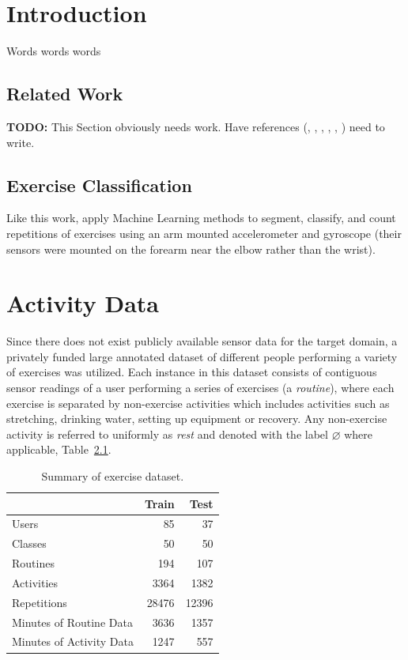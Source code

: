 \documentclass[12pt]{report}
\newcommand{\1}[0]{\mathbbm{1}}
\begin{document}
\chapter{Introduction}
Words words words

\section{Related Work}
\textbf{TODO:} This Section obviously needs work. Have references
(\cite{ms-overview},
\cite{arm-worn-muehlbauer},
\cite{phone-kwapisz},
\cite{weka-aaai-ravi},
\cite{multiple-sensor-bao},
\cite{taylor-crbm-2006}) need to write.

\section{Exercise Classification}
Like this work, \cite{ms-activity} apply Machine Learning methods to segment, classify, and count repetitions
of exercises using an arm mounted accelerometer and gyroscope (their sensors were mounted on the forearm
near the elbow rather than the wrist).

\chapter{Activity Data}
Since there does not exist publicly available sensor data for the target domain, a privately funded
large annotated dataset of different people performing a variety of exercises was utilized.
Each instance in this dataset consists of contiguous sensor readings of a user performing a
series of exercises (a \emph{routine}), where each exercise is separated by non-exercise activities
which includes activities such as stretching, drinking water, setting up  equipment or recovery.
Any non-exercise activity is referred to uniformly as \emph{rest} and denoted with the label
$\varnothing$ where applicable, Table~\ref{table:dataset}.

\begin{table}[ht]
    \centering
    \begin{tabular}{l r r}\hline
    & \textbf{Train} &\textbf{Test} \\\hline
    Users & 85 & 37\\
    Classes & 50 & 50\\
    Routines & 194 & 107\\
    Activities & 3364 & 1382\\
    Repetitions & 28476 & 12396\\
    Minutes of Routine Data & 3636 & 1357\\
    Minutes of Activity Data & 1247 & 557\\
    \end{tabular}
    \caption[Summary of exercise dataset]{Summary of exercise dataset.}
    \label{table:dataset}
\end{table}
\end{document}
